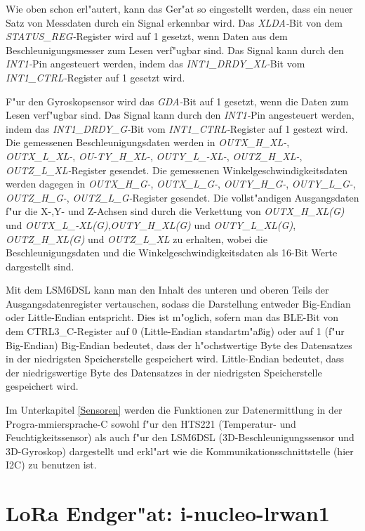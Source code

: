Wie oben schon erl"autert, kann das Ger"at so eingestellt werden, 
dass ein neuer Satz von Messdaten durch ein Signal erkennbar wird. Das 
\textit{XLDA-}Bit von dem \textit{STATUS\_REG-}Register wird auf 1 
gesetzt, wenn Daten aus dem Beschleunigungsmesser zum Lesen verf"ugbar 
sind. Das Signal kann durch den \textit{INT1-}Pin angesteuert werden, 
indem  das \textit{INT1\_DRDY\_XL-}Bit vom 
\textit{INT1\_CTRL-}Register auf 1 gesetzt wird. 

F"ur den Gyroskopsensor wird das \textit{GDA-}Bit auf 1 gesetzt, wenn 
die Daten zum Lesen verf"ugbar sind. Das Signal kann durch den 
\textit{INT1-}Pin angesteuert werden, indem  das 
\textit{INT1\_DRDY\_G-}Bit vom \textit{INT1\_CTRL-}Register auf 1 
gestezt wird. Die gemessenen Beschleunigungsdaten werden in 
\textit{OUTX\_H\_XL-}, \textit{OUTX\_L\_XL-}, \textit{OU-TY\_H\_XL-}, 
\textit{OUTY\_L\_-XL-}, \textit{OUTZ\_H\_XL-}, 
\textit{OUTZ\_L\_XL-}Register gesendet. Die gemessenen 
Winkelgeschwindigkeitsdaten werden dagegen in \textit{OUTX\_H\_G-}, 
\textit{OUTX\_L\_G-}, \textit{OUTY\_H\_G-}, \textit{OUTY\_L\_G-}, 
\textit{OUTZ\_H\_G-}, \textit{OUTZ\_L\_G-}Register gesendet. Die 
vollst"andigen Ausgangsdaten f"ur die X-,Y- und Z-Achsen sind durch 
die Verkettung von \textit{OUTX\_H\_XL(G)} und 
\textit{OUTX\_L\_-XL(G)},\textit{OUTY\_H\_XL(G)} und 
\textit{OUTY\_L\_XL(G)}, \textit{OUTZ\_H\_XL(G)} und 
\textit{OUTZ\_L\_XL} zu erhalten, wobei die Beschleunigungsdaten und 
die Winkelgeschwindigkeitsdaten als 16-Bit Werte dargestellt sind.

Mit dem LSM6DSL kann man den Inhalt des unteren und oberen Teils der 
Ausgangsdatenregister vertauschen, sodass die Darstellung entweder 
Big-Endian oder Little-Endian entspricht. Dies ist m"oglich, sofern 
man das BLE-Bit von dem CTRL3\_C-Register auf 0 (Little-Endian 
standartm"a\ss{}ig) oder auf 1 (f"ur Big-Endian) Big-Endian bedeutet, 
dass der h"ochstwertige Byte des Datensatzes in der niedrigsten 
Speicherstelle gespeichert wird. Little-Endian bedeutet, dass der 
niedrigswertige Byte des Datensatzes in der niedrigsten Speicherstelle 
gespeichert wird.


Im Unterkapitel \ref{Sensoren} werden die Funktionen zur 
Datenermittlung in der Progra-mmiersprache-C sowohl f"ur den HTS221 
(Temperatur- und Feuchtigkeitssensor) als auch f"ur den LSM6DSL 
(3D-Beschleunigungssensor und 3D-Gyroskop) dargestellt und erkl"art wie 
die Kommunikationsschnittstelle (hier I2C) zu benutzen ist.


\section{LoRa Endger"at: i-nucleo-lrwan1}\label{LoRa Modul}

